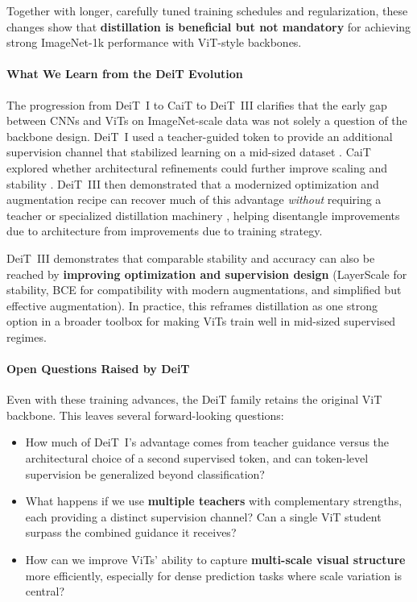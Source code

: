 \noindent
Together with longer, carefully tuned training schedules and regularization,
these changes show that \textbf{distillation is beneficial but not mandatory}
for achieving strong ImageNet-1k performance with ViT-style backbones.

\paragraph{What We Learn from the DeiT Evolution}
\noindent
The progression from DeiT~I to CaiT to DeiT~III clarifies that the early gap between CNNs and ViTs on ImageNet-scale data
was not solely a question of the backbone design.
DeiT~I used a teacher-guided token to provide an additional supervision channel that stabilized learning on a mid-sized dataset \cite{touvron2021_deit}.
CaiT explored whether architectural refinements could further improve scaling and stability \cite{touvron2021_cait}.
DeiT~III then demonstrated that a modernized optimization and augmentation recipe can recover much of this advantage
\emph{without} requiring a teacher or specialized distillation machinery \cite{touvron2022_deitiii},
helping disentangle improvements due to architecture from improvements due to training strategy.

DeiT~III demonstrates that comparable stability and accuracy can also be reached
by \textbf{improving optimization and supervision design}
(LayerScale for stability, BCE for compatibility with modern augmentations, and simplified but effective augmentation).
In practice, this reframes distillation as one strong option in a broader toolbox
for making ViTs train well in mid-sized supervised regimes.

\paragraph{Open Questions Raised by DeiT}
\noindent
Even with these training advances, the DeiT family retains the original ViT backbone.
This leaves several forward-looking questions:

\begin{itemize}
	\item How much of DeiT~I's advantage comes from teacher guidance versus the architectural choice of a second supervised token,
	and can token-level supervision be generalized beyond classification?
	
	\item What happens if we use \textbf{multiple teachers} with complementary strengths,
	each providing a distinct supervision channel?
	Can a single ViT student surpass the combined guidance it receives?
	
	\item How can we improve ViTs' ability to capture \textbf{multi-scale visual structure}
	more efficiently,
	especially for dense prediction tasks where scale variation is central?
\end{itemize}

